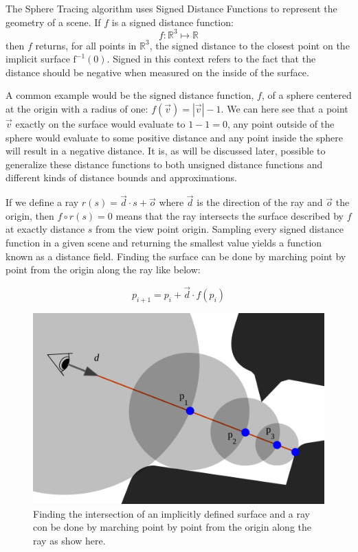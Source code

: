 		The Sphere Tracing algorithm uses Signed Distance Functions to
		represent the geometry of a scene. If $f$ is a signed distance
		function: $$f : \mathbb{R}^{3}\mapsto\mathbb{R}$$ then $f$ returns, for
		all points in $\mathbb{R}^3$, the signed distance to the closest point
		on the implicit surface $\text{f}^{-1}(0)$. Signed in this context
		refers to the fact that the distance should be negative when measured
		on the inside of the surface.

		A common example would be the signed distance function, $f$, of a
		sphere centered at the origin with a radius of one: $f(\vec{v}) =
		|\vec{v}| - 1$. We can here see that a point $\vec{v}$ exactly on the
		surface would evaluate to $1-1=0$, any point outside of the sphere
		would evaluate to some positive distance and any point inside the
		sphere will result in a negative distance. It is, as will be discussed
		later, possible to generalize these distance functions to both unsigned
		distance functions and different kinds of distance bounds and
		approximations.

		If we define a ray $r(s) = \vec{d} \cdot s + \vec{o}$ where $\vec{d}$
		is the direction of the ray and $\vec{o}$ the origin, then $f\circ r(s)
		= 0$ means that the ray intersects the surface described by $f$ at
		exactly distance $s$ from the view point origin. Sampling every signed
		distance function in a given scene and returning the smallest value
		yields a function known as a distance field. Finding the surface can be
		done by marching point by point from the origin along the ray like
		below: 
		
		$$p_{i+1} = p_i + \vec{d}\cdot f(p_i)$$ 
		
		\begin{figure}
			\centering
			\includegraphics[width=0.75\linewidth]{figure/SDF2}
			\caption{Finding the intersection of an implicitly defined surface
				and a ray con be done by marching point by point from the 
				origin along the ray as show here.}
		\end{figure}

